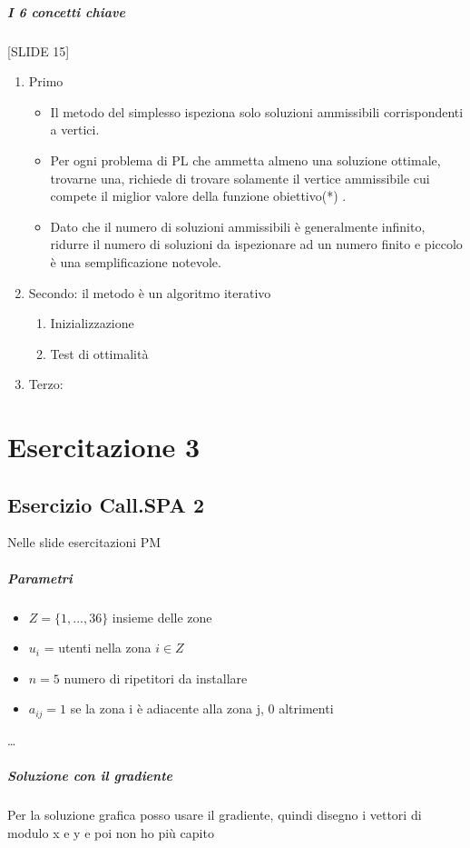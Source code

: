 \documentclass[12pt, a4paper, openany]{book}
\begin{document}
\paragraph*{I 6 concetti chiave} [SLIDE 15]
\begin{enumerate}
    \item Primo
        \begin{itemize}
            \item Il metodo del simplesso ispeziona solo
            soluzioni ammissibili corrispondenti a
            vertici.
            \item Per ogni problema di PL che ammetta
            almeno una soluzione ottimale, trovarne
            una, richiede di trovare solamente il vertice
            ammissibile cui compete il miglior valore
            della funzione obiettivo(*)
            .
            \item Dato che il numero di soluzioni ammissibili
            è generalmente infinito, ridurre il numero
            di soluzioni da ispezionare ad un numero
            finito e piccolo è una semplificazione
            notevole.
        \end{itemize}
    \item Secondo: il metodo è un algoritmo iterativo
    \begin{enumerate}
        \item Inizializzazione
        \item Test di ottimalità
    \end{enumerate}
    \item Terzo: 
\end{enumerate}
 

\chapter*{Esercitazione 3}
\section*{Esercizio Call.SPA 2} Nelle slide esercitazioni PM
\paragraph*{Parametri}
\begin{itemize}
    \item $Z = \{ 1,...,36\}$ insieme delle zone
    \item $u_i$ = utenti nella zona $i \in Z$
    \item $n=5$ numero di ripetitori da installare
    \item $a_{ij} = 1$ se la zona i è adiacente alla zona j, 0 altrimenti
\end{itemize}
\dots
\paragraph*{Soluzione con il gradiente}
Per la soluzione grafica posso usare il gradiente, quindi disegno i vettori di modulo x e y e poi non ho più capito
\end{document}
